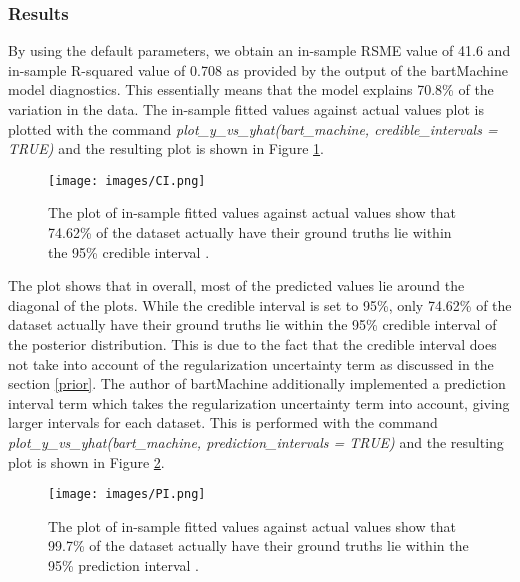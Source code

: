 \documentclass{usiinftr}
\begin{document}
\subsubsection{Results}
By using the default parameters, we obtain an in-sample RSME value of 41.6 and in-sample R-squared value of 0.708 as provided by the output of the bartMachine model diagnostics. This essentially means that the model explains 70.8\% of the variation in the data. The in-sample fitted values against actual values plot is plotted with the command \textit{plot\_y\_vs\_yhat(bart\_machine, credible\_intervals = TRUE)} and the resulting plot is shown in Figure \ref{CI}.


\begin{figure}[h!] 
\centering
\texttt{[image: images/CI.png]}
\caption{The plot of in-sample fitted values against actual values show that 74.62\% of the dataset actually have their ground truths lie within the 95\% credible interval .}
\label{CI}
\end{figure}

The plot shows that in overall, most of the predicted values lie around the diagonal of the plots. While the credible interval is set to 95\%, only 74.62\% of the dataset actually have their ground truths lie within the 95\% credible interval of the posterior distribution. This is due to the fact that the credible interval does not take into account of the regularization uncertainty term as discussed in the section \ref{prior}. The author of bartMachine additionally implemented a prediction interval term which takes the regularization uncertainty term into account, giving larger intervals for each dataset. This is performed with the command \textit{plot\_y\_vs\_yhat(bart\_machine, prediction\_intervals = TRUE)} and the resulting plot is shown in Figure \ref{PI}.

\begin{figure}[h!] 
\centering
\texttt{[image: images/PI.png]}
\caption{The plot of in-sample fitted values against actual values show that 99.7\% of the dataset actually have their ground truths lie within the 95\% prediction interval .}
\label{PI}
\end{figure}
\end{document}
